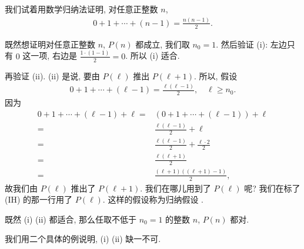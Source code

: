 \begin{example}
    我们试着用数学归纳法证明, 对任意正整数 $n$,
    \begin{align*}
        0 + 1 + \cdots + (n - 1) = \frac{n(n-1)}{2}. \tag*{$P(n) \colon$}
    \end{align*}

    既然想证明对任意正整数 $n$, $P(n)$ 都成立, 我们取 $n_0 = 1$. 然后验证 (i): 左边只有 $0$ 这一项, 右边是 $\frac{1 \cdot (1-1)}{2} = 0$. 所以 (i) 适合.

    再验证 (ii). (ii) 是说, 要由 $P(\ell)$ 推出 $P(\ell + 1)$. 所以, 假设
    \begin{align*}
        0 + 1 + \cdots + (\ell - 1) = \frac{\ell(\ell-1)}{2}, \quad \ell \geq n_0.
    \end{align*}
    因为
    \begin{align*}
        0 + 1 + \cdots + (\ell - 1) + \ell
        = {} & (0 + 1 + \cdots + (\ell - 1)) + \ell            \\
        = {} & \frac{\ell(\ell-1)}{2} + \ell \tag*{(IH)}       \\
        = {} & \frac{\ell(\ell-1)}{2} + \frac{\ell \cdot 2}{2} \\
        = {} & \frac{\ell(\ell+1)}{2}                          \\
        = {} & \frac{(\ell+1)((\ell+1) - 1)}{2},
    \end{align*}
    故我们由 $P(\ell)$ 推出了 $P(\ell + 1)$. 我们在哪儿用到了 $P(\ell)$ 呢? 我们在标了 (IH) 的那一行用了 $P(\ell)$. 这样的假设称为归纳假设 .

    既然 (i) (ii) 都适合, 那么任取不低于 $n_0=1$ 的整数 $n$, $P(n)$ 都对.
\end{example}

我们用二个具体的例说明, (i) (ii) 缺一不可.

